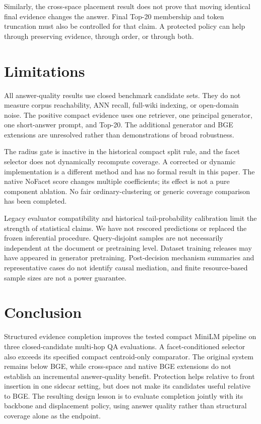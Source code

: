 \documentclass[11pt]{article}
\begin{document}
Similarly, the cross-space placement result does not prove that moving
identical final evidence changes the answer. Final Top-20 membership and
token truncation must also be controlled for that claim. A protected policy
can help through preserving evidence, through order, or through both.

\section{Limitations}
All answer-quality results use closed benchmark candidate sets. They do not
measure corpus reachability, ANN recall, full-wiki indexing, or open-domain
noise. The positive compact evidence uses one retriever, one principal
generator, one short-answer prompt, and Top-20. The additional generator and
BGE extensions are unresolved rather than demonstrations of broad robustness.

The radius gate is inactive in the historical compact split rule, and the
facet selector does not dynamically recompute coverage. A corrected or
dynamic implementation is a different method and has no formal result in this
paper. The native NoFacet score changes multiple coefficients; its effect is
not a pure component ablation. No fair ordinary-clustering or generic
coverage comparison has been completed.

Legacy evaluator compatibility and historical tail-probability calibration
limit the strength of statistical claims. We have not rescored predictions or
replaced the frozen inferential procedure. Query-disjoint samples are not
necessarily independent at the document or pretraining level. Dataset
training releases may have appeared in generator pretraining. Post-decision
mechanism summaries and representative cases do not identify causal
mediation, and finite resource-based sample sizes are not a power guarantee.

\section{Conclusion}
Structured evidence completion improves the tested compact MiniLM pipeline on
three closed-candidate multi-hop QA evaluations. A facet-conditioned selector
also exceeds its specified compact centroid-only comparator. The original
system remains below BGE, while cross-space and native BGE extensions do not
establish an incremental answer-quality benefit. Protection helps relative to
front insertion in one sidecar setting, but does not make its candidates useful
relative to BGE. The resulting design lesson is to evaluate completion jointly
with its backbone and displacement policy, using answer quality rather than
structural coverage alone as the endpoint.
\end{document}
